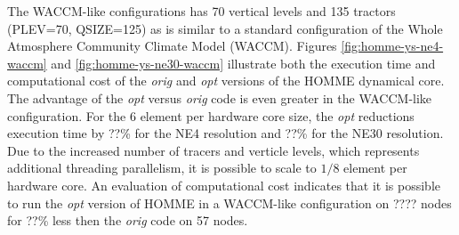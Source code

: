 The WACCM-like configurations has 70 vertical levels and 135 tractors (PLEV=70, QSIZE=125) as is similar to a standard configuration of the Whole Atmosphere Community Climate Model (WACCM).  Figures \ref{fig:homme-ys-ne4-waccm} and \ref{fig:homme-ys-ne30-waccm} illustrate both the execution time and computational cost of the {\em orig} and {\em opt} versions of the HOMME dynamical core.  The advantage of the {\em opt} versus {\em orig} code is even greater in the WACCM-like configuration.  For the 6 element per hardware core size, the {\em opt} reductions execution time by ??\% for the NE4 resolution and ??\% for the NE30 resolution. Due to the increased number of tracers and verticle levels, which represents additional threading parallelism, it is possible to scale to $1/8$ element per hardware core.  An evaluation of computational cost indicates that it is possible to run the {\em opt} version of HOMME in a WACCM-like configuration on ???? nodes for ??\% less then the {\em orig} code on 57 nodes.  

